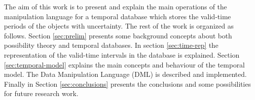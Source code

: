 The aim of this work is to present and explain the main operations of the manipulation language for a temporal database which stores the valid-time periods of the objects with uncertainty. The rest of the work is organized as follows. Section \ref{sec:prelim} presents some background concepts about both possibility theory and temporal databases. In section \ref{sec:time-rep} the representation of the valid-time intervals in the database is explained. Section \ref{sec:temporal-model} explains the main concepts and behaviour of the temporal model. The Data Manipulation Language (DML) is described and implemented. Finally in Section \ref{sec:conclusions} presents the conclusions and some possibilities for future research work.

